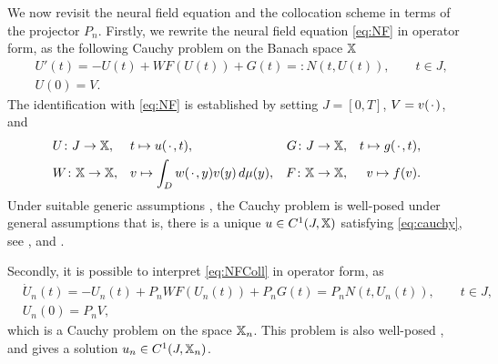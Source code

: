 \documentclass[a4paper]{siamart190516}
\begin{document}
We now revisit the neural field equation and the collocation scheme in terms of the
projector $P_n$. Firstly, we rewrite the neural field equation \cref{eq:NF} in
operator form, as the following Cauchy problem on the Banach space $\mathbb{X}$
\begin{equation}\label{eq:cauchy}
  \begin{aligned}
  & U'(t) = - U(t) + WF(U(t)) + G(t) =:  N(t,U(t)), \qquad t \in J, \\
  & U(0) = V.
  \end{aligned}
\end{equation}
The identification with \cref{eq:NF} is established by setting $J = [0,T]$,
$V = v({\mkern 2mu\cdot\mkern 2mu})$, and
\[  
  \begin{aligned}
   & U \colon J \to \mathbb{X}, && t \mapsto u({\mkern 2mu\cdot\mkern 2mu},t),
   & G \colon J \to \mathbb{X}, && t \mapsto g({\mkern 2mu\cdot\mkern 2mu},t), \\
   & W \colon \mathbb{X} \to \mathbb{X}, && v \mapsto \int_{D} w({\mkern 2mu\cdot\mkern 2mu},y) v(y) \,d \mu(y),
   & F \colon \mathbb{X} \to \mathbb{X}, && v \mapsto f(v). 
  \end{aligned}
\]
Under suitable generic assumptions , the Cauchy problem
is well-posed under general assumptions that is, there is a unique $u \in
C^1(J,\mathbb{X})$ satisfying \cref{eq:cauchy}, see
\cite{Potthast:2009bd,Faugeras:2009gn}, and \cite[Lemma 2.7]{Avitabile:2023ab}.

Secondly, it is possible to interpret \cref{eq:NFColl} in operator form, as
\begin{equation}\label{eq:cauchyPn}
  \begin{aligned}
  & \dot U_n(t) = - U_n(t) + P_n WF(U_n(t)) + P_n G(t) =  P_n N(t,U_n(t)), \qquad t \in J, \\
  & U_n(0) = P_n V,
  \end{aligned}
\end{equation}
which is a Cauchy problem on the space $\mathbb{X}_{n}$. This problem is also well-posed
\cite[Theorem 3.1]{Avitabile:2023ab}, and gives a solution $u_n \in C^1(J,\mathbb{X}_n)$.
\end{document}
